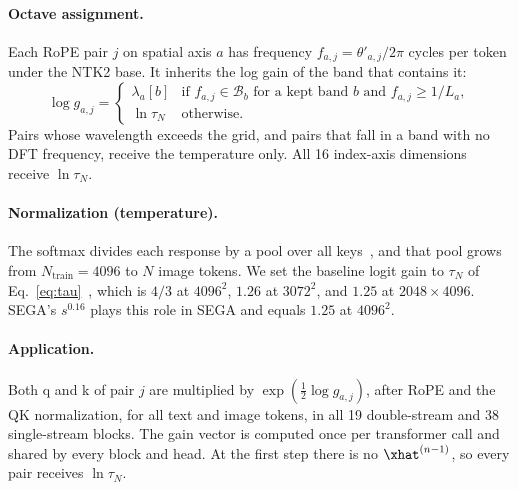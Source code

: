 \paragraph{Octave assignment.}
Each RoPE pair $j$ on spatial axis $a$ has frequency $f_{a,j}=\theta'_{a,j}/2\pi$ cycles per token under the NTK2 base. It inherits the log gain of the band that contains it:
\begin{equation}
\log g_{a,j} =
\begin{cases}
\lambda_a[b] & \text{if } f_{a,j}\in\mathcal B_b \text{ for a kept band } b \text{ and } f_{a,j}\ge 1/L_a,\\
\ln\tau_N & \text{otherwise.}
\end{cases}
\label{eq:assign}
\end{equation}
Pairs whose wavelength exceeds the grid, and pairs that fall in a band with no DFT frequency, receive the temperature only. All 16 index-axis dimensions receive $\ln\tau_N$.

\paragraph{Normalization (temperature).}
The softmax divides each response by a pool over all keys~\citep{heeger1992normalization,carandini2012normalization}, and that pool grows from $N_{\mathrm{train}}=4096$ to $N$ image tokens. We set the baseline logit gain to $\tau_N$ of Eq.~\eqref{eq:tau}~\citep{jin2023training}, which is $4/3$ at $4096^2$, $1.26$ at $3072^2$, and $1.25$ at $2048\times4096$. SEGA's $s^{0.16}$ plays this role in SEGA and equals $1.25$ at $4096^2$.

\paragraph{Application.}
Both q and k of pair $j$ are multiplied by $\exp(\tfrac12\log g_{a,j})$, after RoPE and the QK normalization, for all text and image tokens, in all 19 double-stream and 38 single-stream blocks. The gain vector is computed once per transformer call and shared by every block and head. At the first step there is no $\xhat^{(n-1)}$, so every pair receives $\ln\tau_N$.

